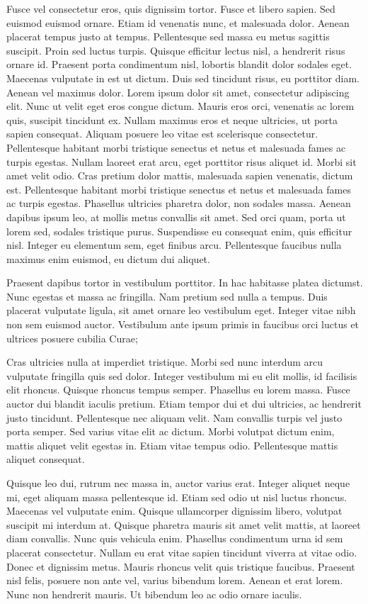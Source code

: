 \documentclass{article}
\begin{document}
Fusce vel consectetur eros, quis dignissim tortor. Fusce et libero sapien. Sed euismod euismod ornare. Etiam id venenatis nunc, et malesuada dolor. Aenean placerat tempus justo at tempus. Pellentesque sed massa eu metus sagittis suscipit. Proin sed luctus turpis. Quisque efficitur lectus nisl, a hendrerit risus ornare id. Praesent porta condimentum nisl, lobortis blandit dolor sodales eget. Maecenas vulputate in est ut dictum. Duis sed tincidunt risus, eu porttitor diam. Aenean vel maximus dolor.
Lorem ipsum dolor sit amet, consectetur adipiscing elit. Nunc ut velit eget eros congue dictum. Mauris eros orci, venenatis ac lorem quis, suscipit tincidunt ex. Nullam maximus eros et neque ultricies, ut porta sapien consequat. Aliquam posuere leo vitae est scelerisque consectetur. Pellentesque habitant morbi tristique senectus et netus et malesuada fames ac turpis egestas. Nullam laoreet erat arcu, eget porttitor risus aliquet id. Morbi sit amet velit odio. Cras pretium dolor mattis, malesuada sapien venenatis, dictum est. Pellentesque habitant morbi tristique senectus et netus et malesuada fames ac turpis egestas. Phasellus ultricies pharetra dolor, non sodales massa. Aenean dapibus ipsum leo, at mollis metus convallis sit amet. Sed orci quam, porta ut lorem sed, sodales tristique purus. Suspendisse eu consequat enim, quis efficitur nisl. Integer eu elementum sem, eget finibus arcu. Pellentesque faucibus nulla maximus enim euismod, eu dictum dui aliquet.

Praesent dapibus tortor in vestibulum porttitor. In hac habitasse platea dictumst. Nunc egestas et massa ac fringilla. Nam pretium sed nulla a tempus. Duis placerat vulputate ligula, sit amet ornare leo vestibulum eget. Integer vitae nibh non sem euismod auctor. Vestibulum ante ipsum primis in faucibus orci luctus et ultrices posuere cubilia Curae;

Cras ultricies nulla at imperdiet tristique. Morbi sed nunc interdum arcu vulputate fringilla quis sed dolor. Integer vestibulum mi eu elit mollis, id facilisis elit rhoncus. Quisque rhoncus tempus semper. Phasellus eu lorem massa. Fusce auctor dui blandit iaculis pretium. Etiam tempor dui et dui ultricies, ac hendrerit justo tincidunt. Pellentesque nec aliquam velit. Nam convallis turpis vel justo porta semper. Sed varius vitae elit ac dictum. Morbi volutpat dictum enim, mattis aliquet velit egestas in. Etiam vitae tempus odio. Pellentesque mattis aliquet consequat.

Quisque leo dui, rutrum nec massa in, auctor varius erat. Integer aliquet neque mi, eget aliquam massa pellentesque id. Etiam sed odio ut nisl luctus rhoncus. Maecenas vel vulputate enim. Quisque ullamcorper dignissim libero, volutpat suscipit mi interdum at. Quisque pharetra mauris sit amet velit mattis, at laoreet diam convallis. Nunc quis vehicula enim. Phasellus condimentum urna id sem placerat consectetur. Nullam eu erat vitae sapien tincidunt viverra at vitae odio. Donec et dignissim metus. Mauris rhoncus velit quis tristique faucibus. Praesent nisl felis, posuere non ante vel, varius bibendum lorem. Aenean et erat lorem. Nunc non hendrerit mauris. Ut bibendum leo ac odio ornare iaculis.
\end{document}
